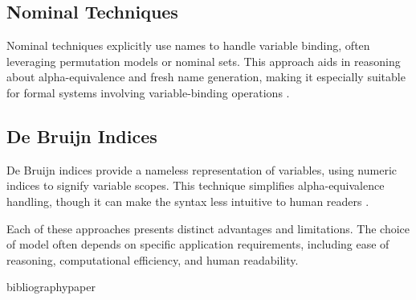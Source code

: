 \documentclass{article}
\begin{document}
\subsection{Nominal Techniques}
Nominal techniques explicitly use names to handle variable binding, often
leveraging permutation models or nominal sets. This approach aids in reasoning
about alpha-equivalence and fresh name generation, making it especially suitable
for formal systems involving variable-binding operations \cite{pitts16nominal}.

\subsection{De Bruijn Indices}
De Bruijn indices provide a nameless representation of variables, using numeric
indices to signify variable scopes. This technique simplifies alpha-equivalence
handling, though it can make the syntax less intuitive to human readers
\cite{bruijn}.

Each of these approaches presents distinct advantages and limitations. The
choice of model often depends on specific application requirements, including
ease of reasoning, computational efficiency, and human readability.

bibliography{paper}{}

\end{document}
